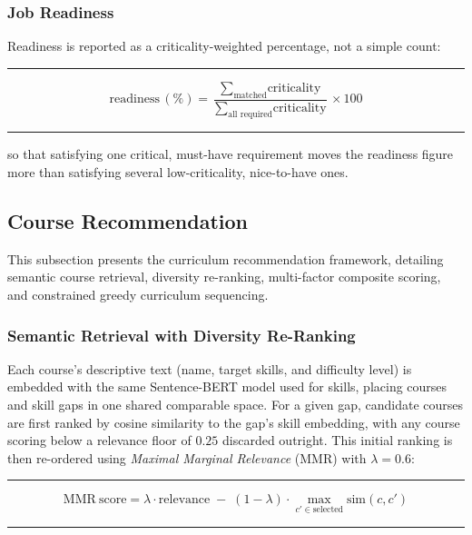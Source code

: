 \documentclass[11pt,a4paper]{article}
\newenvironment{formulabox}
  {\begin{center}\color{TPteal}\rule{0.92\linewidth}{0.8pt}\par\vspace{5pt}\color{TPnavy}}
  {\par\vspace{3pt}\color{TPteal}\rule{0.92\linewidth}{0.8pt}\end{center}}
\begin{document}
\subsubsection{Job Readiness}

Readiness is reported as a criticality-weighted percentage, not a simple count:

\begin{formulabox}
\begin{equation}
\label{eq:readiness}
\mathrm{readiness}\,(\%) = \frac{\sum_{\text{matched}} \text{criticality}}{\sum_{\text{all required}} \text{criticality}} \times 100
\end{equation}
\end{formulabox}

so that satisfying one critical, must-have requirement moves the readiness figure more than satisfying several low-criticality, nice-to-have ones.

\subsection{Course Recommendation}
\label{sec:mod2-courses}

This subsection presents the curriculum recommendation framework, detailing semantic course retrieval, diversity re-ranking, multi-factor composite scoring, and constrained greedy curriculum sequencing.

\subsubsection{Semantic Retrieval with Diversity Re-Ranking}

Each course's descriptive text (name, target skills, and difficulty level) is embedded with the same Sentence-BERT model used for skills, placing courses and skill gaps in one shared comparable space. For a given gap, candidate courses are first ranked by cosine similarity to the gap's skill embedding, with any course scoring below a relevance floor of $0.25$ discarded outright. This initial ranking is then re-ordered using \emph{Maximal Marginal Relevance} (MMR) with $\lambda = 0.6$:

\begin{formulabox}
\begin{equation}
\label{eq:mmr}
\mathrm{MMR\ score} = \lambda \cdot \mathrm{relevance} \;-\; (1-\lambda) \cdot \max_{c' \in \text{selected}} \mathrm{sim}(c, c')
\end{equation}
\end{formulabox}
\end{document}
